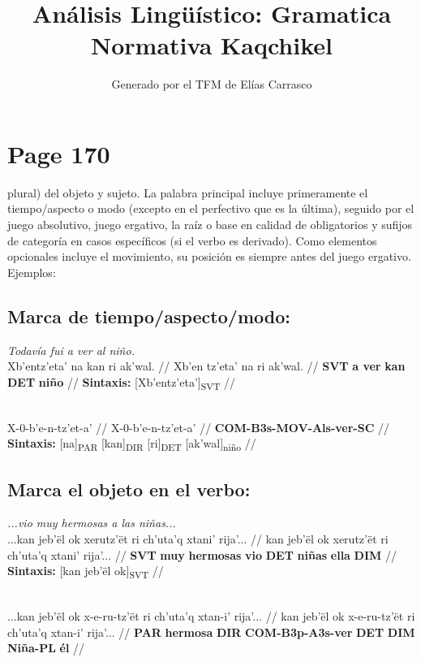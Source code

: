 \documentclass{article}%
\title{Análisis Lingüístico: Gramatica Normativa Kaqchikel}%
\author{Generado por el TFM de Elías Carrasco}%
\begin{document}
%
\normalsize%
\maketitle%
\section{Page 170}%
\label{sec:Page170}%
plural) del objeto y sujeto. La palabra principal incluye primeramente el tiempo/aspecto %
o modo (excepto en el perfectivo que es la última), seguido por el juego absolutivo, %
juego ergativo, la raíz o base en calidad de obligatorios y sufijos de categoría en casos %
específicos (si el verbo es derivado). Como elementos opcionales incluye el movimiento, %
su posición es siempre antes del juego ergativo. Ejemplos: %
\subsection{Marca de tiempo/aspecto/modo:}%
\label{subsec:Marcadetiempo/aspecto/modo}%

%
\par\medskip%
\ex
\textit{Todavía fui a ver al niño.} \\
\begingl
\gla Xb'entz'eta' na kan ri ak'wal. //
\glb Xb'en tz'eta' na ri ak'wal. //
\glc \textbf{SVT} \textbf{a ver} \textbf{kan} \textbf{DET} \textbf{niño} //
\glft \textbf{Sintaxis:} [Xb'entz'eta']\textsubscript{SVT} //
\endgl
\xe
%
\medskip%
\par\medskip%
\ex
\textit{} \\
\begingl
\gla X-0-b'e-n-tz'et-a' //
\glb X-0-b'e-n-tz'et-a' //
\glc \textbf{COM-}\textbf{B3s-}\textbf{MOV-}\textbf{Als-}\textbf{ver-}\textbf{SC} //
\glft \textbf{Sintaxis:} [na]\textsubscript{PAR} [kan]\textsubscript{DIR} [ri]\textsubscript{DET} [ak'wal]\textsubscript{niño} //
\endgl
\xe
%
\medskip%
\subsection{Marca el objeto en el verbo:}%
\label{subsec:Marcaelobjetoenelverbo}%

%
\par\medskip%
\ex
\textit{...vio muy hermosas a las niñas...} \\
\begingl
\gla ...kan jeb'ël ok xerutz'ët ri ch'uta'q xtani' rija'... //
\glb kan jeb'ël ok xerutz'ët ri ch'uta'q xtani' rija'... //
\glc \textbf{SVT} \textbf{muy} \textbf{hermosas} \textbf{vio} \textbf{DET} \textbf{niñas} \textbf{ella} \textbf{DIM} //
\glft \textbf{Sintaxis:} [kan jeb'ël ok]\textsubscript{SVT} //
\endgl
\xe
%
\medskip%
\par\medskip%
\ex
\textit{} \\
\begingl
\gla ...kan jeb'ël ok x-e-ru-tz'ët ri ch'uta'q xtan-i' rija'... //
\glb kan jeb'ël ok x-e-ru-tz'ët ri ch'uta'q xtan-i' rija'... //
\glc \textbf{PAR} \textbf{hermosa} \textbf{DIR} \textbf{COM-}\textbf{B3p-}\textbf{A3s-}\textbf{ver} \textbf{DET} \textbf{DIM} \textbf{Niña-PL} \textbf{él} //
\endgl
\xe
%
\medskip%
\end{document}
